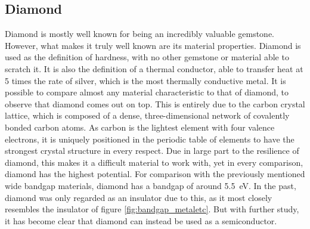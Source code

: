 \begin{refsection}
\subsection{Diamond}
Diamond is mostly well known for being an incredibly valuable gemstone. However, what makes it truly well known are its material properties. Diamond is used as the definition of hardness, with no other gemstone or material able to scratch it. It is also the definition of a thermal conductor, able to transfer heat at 5 times the rate of silver, which is the most thermally conductive metal. It is possible to compare almost any material characteristic to that of diamond, to observe that diamond comes out on top. This is entirely due to the carbon crystal lattice, which is composed of a dense, three-dimensional network of covalently bonded carbon atoms. As carbon is the lightest element with four valence electrons, it is uniquely positioned in the periodic table of elements to have the strongest crystal structure in every respect. Due in large part to the resilience of diamond, this makes it a difficult material to work with, yet in every comparison, diamond has the highest potential. For comparison with the previously mentioned wide bandgap materials, diamond has a bandgap of around 5.5~\si{\electronvolt}. In the past, diamond was only regarded as an insulator due to this, as it most closely resembles the insulator of figure \ref{fig:bandgap_metaletc}. But with further study, it has become clear that diamond can instead be used as a semiconductor.


\end{refsection}
